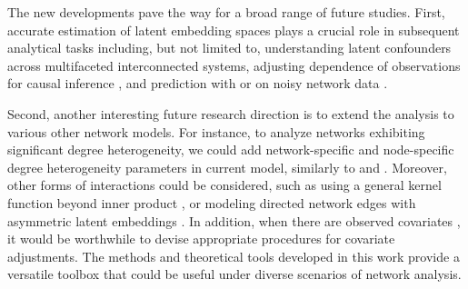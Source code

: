 \documentclass[12pt]{article}
\newcommand{\mytrans}{\top}
\begin{document}
The new developments pave the way for a broad range of future studies. 
First, accurate estimation of latent embedding spaces plays a crucial role in  subsequent analytical tasks including, but not limited to, understanding latent confounders across multifaceted interconnected systems,  adjusting dependence of observations for causal inference  \citep{mcfowland2023estimating,nath2022identifying,hayes2022estimating}, and  prediction with or on noisy network data \citep{ma2020universal,le2022linear,lunde2023conformal}.   


Second, another interesting future research direction is to  extend the  analysis to various other network models. %
For instance, to analyze networks exhibiting  significant degree heterogeneity, we could add network-specific and node-specific degree heterogeneity parameters in current model, similarly to   \cite{zhang2020flexible} and \cite{he2023semiparametric}. %
Moreover, other forms of interactions could be considered, such as using  a general kernel function beyond inner product \citep{rubin2022statistical,macdonald2022latent},
or modeling directed network edges with asymmetric latent embeddings  \citep{perry2013point,yan2019statistical}.  
In addition, when there are observed covariates \citep{yan2021covariate,huang2018pairwise}, it would be worthwhile to devise appropriate procedures for  covariate adjustments. %
The  methods and theoretical tools developed in this work provide a versatile toolbox that could be useful under  diverse scenarios of network analysis.  
\end{document}
